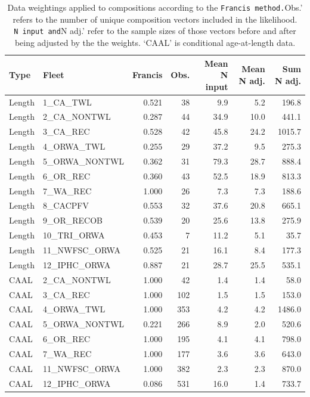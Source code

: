\documentclass[
]{scrartcl}
\begin{document}
\begin{longtable}{llrrrrr}

\caption{\label{tbl-compweight}Data weightings applied to compositions
according to the \texttt{Francis\textquotesingle{}\ method.}Obs.' refers
to the number of unique composition vectors included in the likelihood.
\texttt{N\ input\textquotesingle{}\ and}N adj.' refer to the sample
sizes of those vectors before and after being adjusted by the the
weights. `CAAL' is conditional age-at-length data.}

\tabularnewline

\toprule
Type & Fleet & Francis & Obs. & Mean N input & Mean N adj. & Sum N adj. \\ 
\midrule\addlinespace[2.5pt]
Length & 1\_CA\_TWL & 0.521 & 38 & 9.9 & 5.2 & 196.8 \\ 
Length & 2\_CA\_NONTWL & 0.287 & 44 & 34.9 & 10.0 & 441.1 \\ 
Length & 3\_CA\_REC & 0.528 & 42 & 45.8 & 24.2 & 1015.7 \\ 
Length & 4\_ORWA\_TWL & 0.255 & 29 & 37.2 & 9.5 & 275.3 \\ 
Length & 5\_ORWA\_NONTWL & 0.362 & 31 & 79.3 & 28.7 & 888.4 \\ 
Length & 6\_OR\_REC & 0.360 & 43 & 52.5 & 18.9 & 813.3 \\ 
Length & 7\_WA\_REC & 1.000 & 26 & 7.3 & 7.3 & 188.6 \\ 
Length & 8\_CACPFV & 0.553 & 32 & 37.6 & 20.8 & 665.1 \\ 
Length & 9\_OR\_RECOB & 0.539 & 20 & 25.6 & 13.8 & 275.9 \\ 
Length & 10\_TRI\_ORWA & 0.453 & 7 & 11.2 & 5.1 & 35.7 \\ 
Length & 11\_NWFSC\_ORWA & 0.525 & 21 & 16.1 & 8.4 & 177.3 \\ 
Length & 12\_IPHC\_ORWA & 0.887 & 21 & 28.7 & 25.5 & 535.1 \\ 
CAAL & 2\_CA\_NONTWL & 1.000 & 42 & 1.4 & 1.4 & 58.0 \\ 
CAAL & 3\_CA\_REC & 1.000 & 102 & 1.5 & 1.5 & 153.0 \\ 
CAAL & 4\_ORWA\_TWL & 1.000 & 353 & 4.2 & 4.2 & 1486.0 \\ 
CAAL & 5\_ORWA\_NONTWL & 0.221 & 266 & 8.9 & 2.0 & 520.6 \\ 
CAAL & 6\_OR\_REC & 1.000 & 195 & 4.1 & 4.1 & 798.0 \\ 
CAAL & 7\_WA\_REC & 1.000 & 177 & 3.6 & 3.6 & 643.0 \\ 
CAAL & 11\_NWFSC\_ORWA & 1.000 & 382 & 2.3 & 2.3 & 870.0 \\ 
CAAL & 12\_IPHC\_ORWA & 0.086 & 531 & 16.0 & 1.4 & 733.7 \\ 
\bottomrule

\end{longtable}
\end{document}
